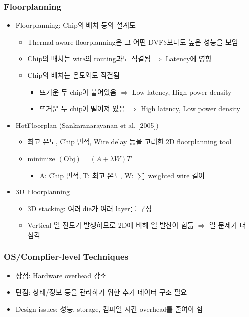 \subsubsection*{Floorplanning}
\begin{itemize}
    \item Floorplanning: Chip의 배치 등의 설계도
    \begin{itemize}
        \item Thermal-aware floorplanning은 그 어떤 DVFS보다도 높은 성능을 보임
        \item Chip의 배치는 wire의 routing과도 직결됨 $\Rightarrow$ Latency에 영향
        \item Chip의 배치는 온도와도 직결됨
        \begin{itemize}
            \item 뜨거운 두 chip이 붙어있음 $\Rightarrow$ Low latency, High power density
            \item 뜨거운 두 chip이 떨어져 있음 $\Rightarrow$ High latency, Low power density
        \end{itemize}
    \end{itemize}
    \item HotFloorplan (Sankaranarayanan et al. [2005])
    \begin{itemize}
        \item 최고 온도, Chip 면적, Wire delay 등을 고려한 2D floorplanning tool
        \item minimize $(\mathrm{Obj}) = (A + \lambda W)T$
        \begin{itemize}
            \item A: Chip 면적, T: 최고 온도, W: $\sum$ weighted wire 길이
        \end{itemize}
    \end{itemize}
    \item 3D Floorplanning
    \begin{itemize}
        \item 3D stacking: 여러 die가 여러 layer를 구성
        \item Vertical 열 전도가 발생하므로 2D에 비해 열 발산이 힘듦 $\Rightarrow$ 열 문제가 더 심각
    \end{itemize}
\end{itemize}

\subsubsection*{OS/Complier-level Techniques}
\begin{itemize}
    \item 장점: Hardware overhead 감소
    \item 단점: 상태/정보 등을 관리하기 위한 추가 데이터 구조 필요
    \item Design issues: 성능, storage, 컴파일 시간 overhead를 줄여야 함
\end{itemize}
\newpage

